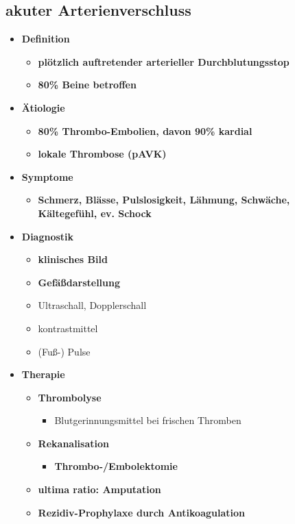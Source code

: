 \subsection{akuter Arterienverschluss}
	\begin{itemize}
		\item \textbf{Definition}
			\begin{itemize}
				\item \textbf{plötzlich auftretender arterieller Durchblutungsstop}
				\item \textbf{80\% Beine betroffen}
			\end{itemize}
		\item \textbf{Ätiologie}
			\begin{itemize}
				\item \textbf{80\% Thrombo-Embolien, davon 90\% kardial}
				\item \textbf{lokale Thrombose (pAVK)}
		\end{itemize}
		\item \textbf{Symptome}
			\begin{itemize}
				\item \textbf{Schmerz, Blässe, Pulslosigkeit, Lähmung, Schwäche, Kältegefühl, ev. Schock}
			\end{itemize}
\pagebreak
		\item \textbf{Diagnostik}
			\begin{itemize}
				\item \textbf{klinisches Bild}
				\item \textbf{Gefäßdarstellung}
				\item Ultraschall, Dopplerschall
				\item kontrastmittel
				\item (Fuß-) Pulse
			\end{itemize}
		\item \textbf{Therapie}
			\begin{itemize}
				\item \textbf{Thrombolyse}
					\begin{itemize}
						\item Blutgerinnungsmittel bei frischen Thromben
					\end{itemize}
				\item \textbf{Rekanalisation}
					\begin{itemize}
						\item \textbf{Thrombo-/Embolektomie}
					\end{itemize}
				\item \textbf{ultima ratio: Amputation}
				\item \textbf{Rezidiv-Prophylaxe durch Antikoagulation}
			\end{itemize}
	\end{itemize}
		
